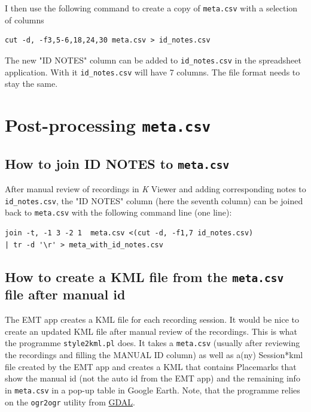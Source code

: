 \documentclass[English, 11pt, twoside, authoryear]{article}
\begin{document}
I then use the following command to create a copy of \texttt{meta.csv} with a selection of columns
\begin{lstlisting}[numbers=none]
cut -d, -f3,5-6,18,24,30 meta.csv > id_notes.csv
\end{lstlisting}

The new "ID NOTES" column can be added to \texttt{id\_notes.csv} in the spreadsheet application. With it \texttt{id\_notes.csv} will have 7 columns. The file format needs to stay the same.

%
%
%
\section{Post-processing \texttt{meta.csv}}
%
%
%

%
%
\subsection{How to join ID NOTES to \texttt{meta.csv}}
%
%

After manual review of recordings in \emph{K} Viewer and adding corresponding notes to \texttt{id\_notes.csv}, the "ID NOTES" column (here the seventh column) can be joined back to \texttt{meta.csv} with the following command line (one line):

\begin{lstlisting}
join -t, -1 3 -2 1  meta.csv <(cut -d, -f1,7 id_notes.csv) 
| tr -d '\r' > meta_with_id_notes.csv
\end{lstlisting}


%
%
\subsection{How to create a KML file from the \texttt{meta.csv} file after manual id}
%
%

The EMT app creates a KML file for each recording session. It would be nice to create an updated KML file after manual review of the recordings. This is what the programme \texttt{style2kml.pl} does. It takes a \texttt{meta.csv} (usually after reviewing the recordings and filling the MANUAL ID column) as well as a(ny) Session*kml file created by the EMT app and creates a KML that contains Placemarks that show the manual id (not the auto id from the EMT app) and the remaining info in \texttt{meta.csv} in a pop-up table in Google Earth. Note, that the programme relies on the \texttt{ogr2ogr} utility from \href{https://gdal.org/download.html}{GDAL}.
\end{document}
